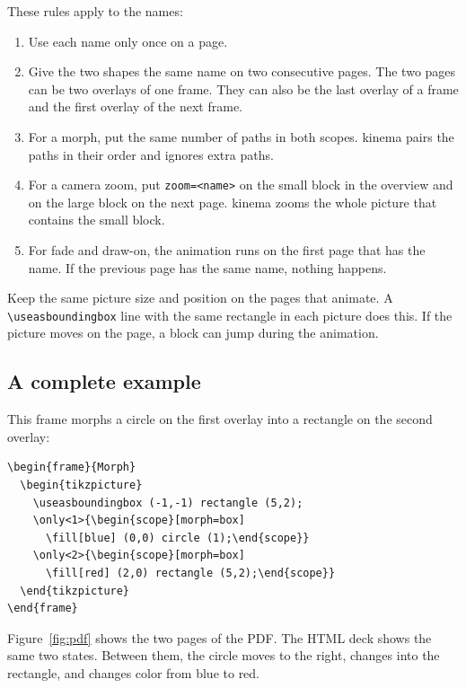 \documentclass[11pt]{article}
\newcommand{\pkg}{\textsf{kinema}}
\newcommand{\cmd}[1]{\texttt{#1}}
\begin{document}
These rules apply to the names:
\begin{enumerate}
	\item Use each name only once on a page.
	\item Give the two shapes the same name on two consecutive pages. The two pages
	      can be two overlays of one frame. They can also be the last overlay of a frame
	      and the first overlay of the next frame.
	\item For a morph, put the same number of paths in both scopes. \pkg{} pairs the
	      paths in their order and ignores extra paths.
	\item For a camera zoom, put \cmd{zoom=<name>} on the small block in the
	      overview and on the large block on the next page. \pkg{} zooms the whole
	      picture that contains the small block.
	\item For fade and draw-on, the animation runs on the first page that has the
	      name. If the previous page has the same name, nothing happens.
\end{enumerate}

Keep the same picture size and position on the pages that animate. A
\cmd{\textbackslash useasboundingbox} line with the same rectangle in each picture
does this. If the picture moves on the page, a block can jump during the
animation.

\subsection{A complete example}

This frame morphs a circle on the first overlay into a rectangle on the second
overlay:
\begin{lstlisting}
\begin{frame}{Morph}
  \begin{tikzpicture}
    \useasboundingbox (-1,-1) rectangle (5,2);
    \only<1>{\begin{scope}[morph=box]
      \fill[blue] (0,0) circle (1);\end{scope}}
    \only<2>{\begin{scope}[morph=box]
      \fill[red] (2,0) rectangle (5,2);\end{scope}}
  \end{tikzpicture}
\end{frame}
\end{lstlisting}
Figure~\ref{fig:pdf} shows the two pages of the PDF. The HTML deck shows the same
two states. Between them, the circle moves to the right, changes into the
rectangle, and changes color from blue to red.
\end{document}
